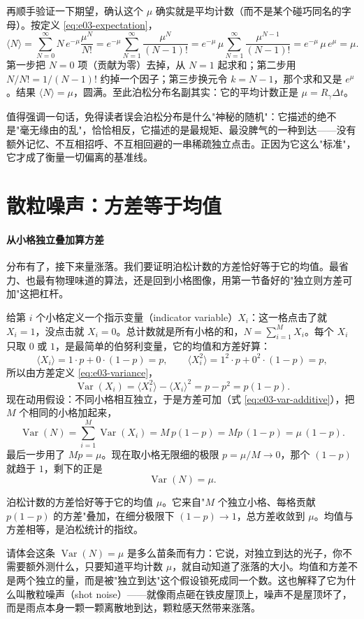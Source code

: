 再顺手验证一下期望，确认这个 $\mu$ 确实就是平均计数（而不是某个碰巧同名的字母）。按定义 \eqref{eq:e03-expectation}，
\[
  \langle N\rangle
  =\sum_{N=0}^{\infty}N\,e^{-\mu}\frac{\mu^{N}}{N!}
  =e^{-\mu}\sum_{N=1}^{\infty}\frac{\mu^{N}}{(N-1)!}
  =e^{-\mu}\,\mu\sum_{N=1}^{\infty}\frac{\mu^{N-1}}{(N-1)!}
  =e^{-\mu}\,\mu\,e^{\mu}=\mu .
\]
第一步把 $N=0$ 项（贡献为零）去掉，从 $N=1$ 起求和；第二步用 $N/N!=1/(N-1)!$ 约掉一个因子；第三步换元令 $k=N-1$，那个求和又是 $e^{\mu}$。结果 $\langle N\rangle=\mu$，圆满。至此泊松分布名副其实：它的平均计数正是 $\mu=R_\gamma\Delta t$。

值得强调一句话，免得读者误会泊松分布是什么"神秘的随机"：它描述的绝不是"毫无缘由的乱"，恰恰相反，它描述的是最规矩、最没脾气的一种到达——没有额外记忆、不互相招呼、不互相回避的一串稀疏独立点击。正因为它这么"标准"，它才成了衡量一切偏离的基准线。

\section{散粒噪声：方差等于均值}
\label{sec:e03-shotnoise}

\paragraph{从小格独立叠加算方差}

分布有了，接下来量涨落。我们要证明泊松计数的方差恰好等于它的均值。最省力、也最有物理味道的算法，还是回到小格图像，用第一节备好的"独立则方差可加"这把杠杆。

给第 $i$ 个小格定义一个指示变量（indicator variable）$X_i$：这一格点击了就 $X_i=1$，没点击就 $X_i=0$。总计数就是所有小格的和，$N=\sum_{i=1}^{M}X_i$。每个 $X_i$ 只取 $0$ 或 $1$，是最简单的伯努利变量，它的均值和方差好算：
\[
  \langle X_i\rangle=1\cdot p+0\cdot(1-p)=p,\qquad
  \langle X_i^{2}\rangle=1^{2}\cdot p+0^{2}\cdot(1-p)=p ,
\]
所以由方差定义 \eqref{eq:e03-variance}，
\[
  \operatorname{Var}(X_i)=\langle X_i^{2}\rangle-\langle X_i\rangle^{2}=p-p^{2}=p(1-p).
\]
现在动用假设：不同小格相互独立，于是方差可加（式 \eqref{eq:e03-var-additive}），把 $M$ 个相同的小格加起来，
\[
  \operatorname{Var}(N)=\sum_{i=1}^{M}\operatorname{Var}(X_i)=M\,p(1-p)=Mp\,(1-p)=\mu\,(1-p).
\]
最后一步用了 $Mp=\mu$。现在取小格无限细的极限 $p=\mu/M\to0$，那个 $(1-p)$ 就趋于 $1$，剩下的正是
\begin{equation}
  \operatorname{Var}(N)=\mu .
  \label{eq:e03-var-equals-mean}
\end{equation}
\begin{formulaexplain}
泊松计数的方差恰好等于它的均值 $\mu$。它来自"$M$ 个独立小格、每格贡献 $p(1-p)$ 的方差"叠加，在细分极限下 $(1-p)\to1$，总方差收敛到 $\mu$。均值与方差相等，是泊松统计的指纹。
\end{formulaexplain}
请体会这条 $\operatorname{Var}(N)=\mu$ 是多么苗条而有力：它说，对独立到达的光子，你不需要额外测什么，只要知道平均计数 $\mu$，就自动知道了涨落的大小。均值和方差不是两个独立的量，而是被"独立到达"这个假设锁死成同一个数。这也解释了它为什么叫散粒噪声（shot noise）——就像雨点砸在铁皮屋顶上，噪声不是屋顶坏了，而是雨点本身一颗一颗离散地到达，颗粒感天然带来涨落。

